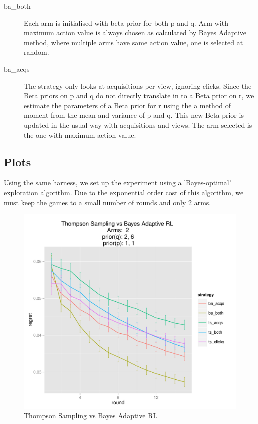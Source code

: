 \documentclass[11pt,a4,singlespacing,titlepagenumber=on]{scrreprt}
\numberwithin{equation}{chapter} %
\theoremstyle{remark}
\begin{document}
\begin{description}
	\item[ba\_both] Each arm is initialised with beta prior for both p and q. Arm with maximum action value is always chosen as calculated by Bayes Adaptive method, where multiple arms have same action value, one is selected at random. 
	\item[ba\_acqs] The strategy only looks at acquisitions per view, ignoring clicks. Since the Beta priors on p and q do not directly translate in to a Beta prior on r, we estimate the parameters of a Beta prior for r using the a method of moment from the mean and variance of p and q. This new Beta prior is updated in the usual way with acquisitions and views. The arm selected is the one with maximum action value.
\end{description}




\subsection{Plots}

Using the same harness, we set up the experiment using a 'Bayes-optimal' exploration algorithm. Due to the exponential order cost of this algorithm, we must keep the games to a small number of rounds and only 2 arms.

\begin{figure}[H]
    \centering
    \includegraphics[scale=0.9]{TSvsBARL.pdf}
    \caption{ Thompson Sampling vs Bayes Adaptive RL }
\end{figure}
\end{document}
